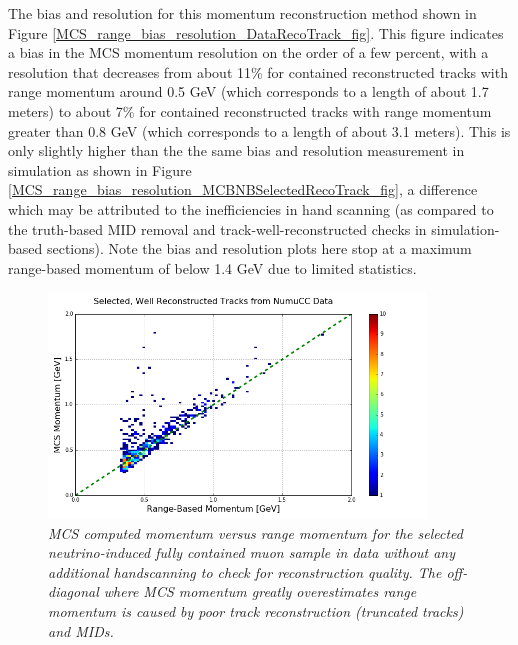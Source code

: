 The bias and resolution for this momentum reconstruction method shown in Figure \ref{MCS_range_bias_resolution_DataRecoTrack_fig}. This figure indicates a bias in the MCS momentum resolution on the order of a few percent, with a resolution that decreases from about 11\% for contained reconstructed tracks with range momentum around 0.5 GeV (which corresponds to a length of about 1.7 meters) to about 7\% for contained reconstructed tracks with range momentum greater than 0.8 GeV (which corresponds to a length of about 3.1 meters). This is only slightly higher than the the same bias and resolution measurement in simulation as shown in Figure \ref{MCS_range_bias_resolution_MCBNBSelectedRecoTrack_fig}, a difference which may be attributed to the inefficiencies in hand scanning (as compared to the truth-based MID removal and track-well-reconstructed checks in simulation-based sections). Note the bias and resolution plots here stop at a maximum range-based momentum of below 1.4 GeV due to limited statistics.


\begin{figure}[ht!]
\begin{center}
\includegraphics[width=100mm]{Figures/MCS_range_comparison_DataBNBSelectedRecoTrack.png}
\end{center}
\caption{\textit{MCS computed momentum versus range momentum for the selected neutrino-induced fully contained muon sample in data without any additional handscanning to check for reconstruction quality. The off-diagonal where MCS momentum greatly overestimates range momentum is caused by poor track reconstruction (truncated tracks) and MIDs.}}
\label{MCS_range_momentum_DataRecoTrack_nohandscan_fig}
\end{figure}

